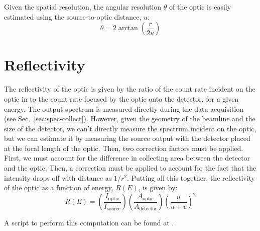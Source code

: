 Given the spatial resolution, the angular resolution $\theta$ of the optic is
easily estimated using the source-to-optic distance, $u$:
\begin{equation}
  \label{eq:ang_res}
  \theta = 2 \arctan{ \left( \frac{r}{2u} \right) }
\end{equation}

\section{Reflectivity}

The reflectivity of the optic is given by the ratio of the count rate incident
on the optic in to the count rate focused by the optic onto the detector, for a
given energy. The output spectrum is measured directly during the data
acquisition (see Sec.~\ref{sec:spec-collect}). However, given the geometry of the
beamline and the size of the detector, we can't directly measure the spectrum
incident on the optic, but we can estimate it by measuring the source output
with the detector placed at the focal length of the optic. Then, two correction
factors must be applied. First, we must account for the difference in collecting
area between the detector and the optic. Then, a correction must be applied to
account for the fact that the intensity drops off with distance as
$1/r^2$. Putting all this together, the reflectivity of the optic as a function
of energy, $R(E)$, is given by:
\begin{equation}
  \label{eq:refl}
  R(E) = \left( \frac{ I_\text{optic} }{ I_\text{source} } \right)
  \left( \frac{ A_\text{optic} }{ A_\text{detector} } \right)
  \left( \frac{ u }{ u+v } \right)^2
\end{equation}

A script to perform this computation can be found at
. 
